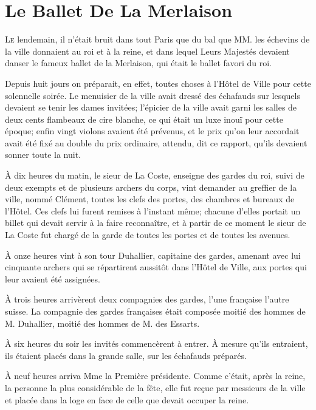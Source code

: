 
\chapter{Le Ballet De La Merlaison}

\lettrine{L}{e} lendemain, il n'était bruit dans tout Paris que du bal que MM. les échevins de la ville donnaient au roi et à la reine, et dans lequel Leurs Majestés devaient danser le fameux ballet de la Merlaison, qui était le ballet favori du roi. 

Depuis huit jours on préparait, en effet, toutes choses à l'Hôtel de Ville pour cette solennelle soirée. Le menuisier de la ville avait dressé des échafauds sur lesquels devaient se tenir les dames invitées; l'épicier de la ville avait garni les salles de deux cents flambeaux de cire blanche, ce qui était un luxe inouï pour cette époque; enfin vingt violons avaient été prévenus, et le prix qu'on leur accordait avait été fixé au double du prix ordinaire, attendu, dit ce rapport, qu'ils devaient sonner toute la nuit. 

À dix heures du matin, le sieur de La Coste, enseigne des gardes du roi, suivi de deux exempts et de plusieurs archers du corps, vint demander au greffier de la ville, nommé Clément, toutes les clefs des portes, des chambres et bureaux de l'Hôtel. Ces clefs lui furent remises à l'instant même; chacune d'elles portait un billet qui devait servir à la faire reconnaître, et à partir de ce moment le sieur de La Coste fut chargé de la garde de toutes les portes et de toutes les avenues. 

À onze heures vint à son tour Duhallier, capitaine des gardes, amenant avec lui cinquante archers qui se répartirent aussitôt dans l'Hôtel de Ville, aux portes qui leur avaient été assignées. 

À trois heures arrivèrent deux compagnies des gardes, l'une française l'autre suisse. La compagnie des gardes françaises était composée moitié des hommes de M. Duhallier, moitié des hommes de M. des Essarts. 

À six heures du soir les invités commencèrent à entrer. À mesure qu'ils entraient, ils étaient placés dans la grande salle, sur les échafauds préparés. 

À neuf heures arriva Mme la Première présidente. Comme c'était, après la reine, la personne la plus considérable de la fête, elle fut reçue par messieurs de la ville et placée dans la loge en face de celle que devait occuper la reine. 

